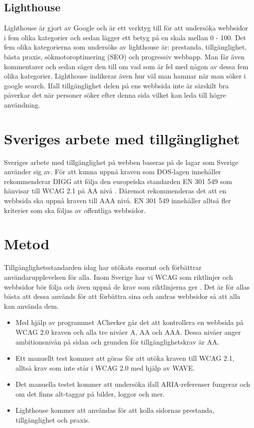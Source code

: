 \documentclass[11p]{article}
\begin{document}
    \subsection{Lighthouse}
    Lighthouse är gjort av Google och är ett verktyg till för att undersöka webbsidor i fem olika kategorier och sedan lägger ett betyg på en skala mellan 0 - 100.
    Det fem olika kategorierna som undersöks av lighthouse är: prestanda, tillgänglighet, bästa praxis, sökmotoroptimering (SEO) och progressiv webbapp.
    Man får även kommentarer och sedan säger den till om vad som är fel med någon av dessa fem olika kategorier.
    Lighthouse indikerar även hur väl man hamnar när man söker i google search.
    Ifall tillgänglighet delen på ens webbsida inte är särskilt bra påverkar det när personer söker efter denna sida vilket kan leda till högre användning.
    
    \section{Sveriges arbete med tillgänglighet}
    Sveriges arbete med tillgänglighet på webben baseras på de lagar som Sverige använder sig av.
    För att kunna uppnå kraven som DOS-lagen innehåller rekommenderar DIGG att följa den europeiska standarden EN 301 549 som hänvisar till WCAG 2.1 på AA nivå \textcite{Digg_Dos}.
    Däremot rekommenderas det att en webbsida ska uppnå kraven till AAA nivå.
    EN 301 549 innehåller alltså fler kriterier som ska följas av offentliga webbsidor.

    \section{Metod}
    Tillgänglighetsstandarden idag har utökats enormt och förbättrar användarupplevelsen för alla.
    Inom Sverige har vi WCAG som riktlinjer och webbsidor bör följa och även uppnå de krav som riktlinjerna ger \textcite{Digg}.
    Det är för allas bästa att dessa används för att förbättra sina och andras webbsidor så att alla kan använda dem.

    \begin{itemize}
        \item Med hjälp av programmet AChecker går det att kontrollera en webbsida på WCAG 2.0 kraven och alla tre nivåer A, AA och AAA. Dessa nivåer anger ambitionsnivån på sidan och grunden för tillgänglighetskrav är AA.
        \item Ett manuellt test kommer att göras för att utöka kraven till WCAG 2.1, alltså krav som inte står i WCAG 2.0 med hjälp av WAVE.
        \item Det manuella testet kommer att undersöka ifall ARIA-referenser fungerar och om det finns alt-taggar på bilder, loggor och mer.
        \item Lighthouse kommer att användas för att kolla sidornas prestanda, tillgänglighet och praxis.
    \end{itemize}
\end{document}
